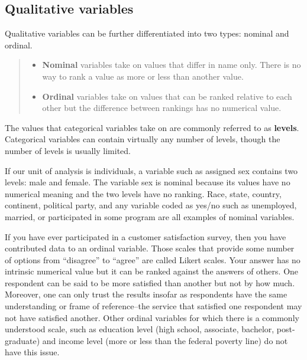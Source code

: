 \documentclass[
]{book}
\providecommand{\tightlist}{%
  \setlength{\itemsep}{0pt}\setlength{\parskip}{0pt}}
\begin{document}
\hypertarget{qualitative-variables}{%
\subsection{Qualitative variables}\label{qualitative-variables}}

Qualitative variables can be further differentiated into two types: nominal and ordinal.

\begin{quote}
\begin{itemize}
\tightlist
\item
  \textbf{Nominal} variables take on values that differ in name only. There is no way to rank a value as more or less than another value.
\item
  \textbf{Ordinal} variables take on values that can be ranked relative to each other but the difference between rankings has no numerical value.
\end{itemize}
\end{quote}

The values that categorical variables take on are commonly referred to as \textbf{levels}. Categorical variables can contain virtually any number of levels, though the number of levels is usually limited.

If our unit of analysis is individuals, a variable such as assigned sex contains two levels: male and female. The variable sex is nominal because its values have no numerical meaning and the two levels have no ranking. Race, state, country, continent, political party, and any variable coded as yes/no such as unemployed, married, or participated in some program are all examples of nominal variables.

If you have ever participated in a customer satisfaction survey, then you have contributed data to an ordinal variable. Those scales that provide some number of options from ``disagree'' to ``agree'' are called Likert scales. Your answer has no intrinsic numerical value but it can be ranked against the answers of others. One respondent can be said to be more satisfied than another but not by how much. Moreover, one can only trust the results insofar as respondents have the same understanding or frame of reference--the service that satisfied one respondent may not have satisfied another. Other ordinal variables for which there is a commonly understood scale, such as education level (high school, associate, bachelor, post-graduate) and income level (more or less than the federal poverty line) do not have this issue.
\end{document}
